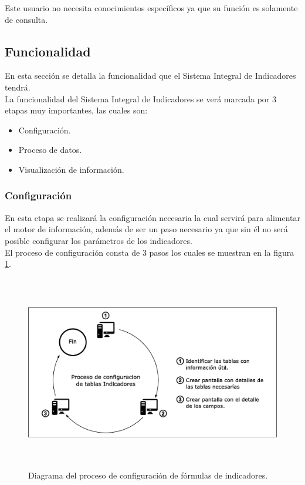				Este usuario no necesita conocimientos espec\'ificos ya que su funci\'on es solamente de consulta.

		\subsection{Funcionalidad}

			En esta secci\'on se detalla la funcionalidad que el Sistema Integral de Indicadores tendr\'a.\\

			La funcionalidad del Sistema Integral de Indicadores se ver\'a marcada por 3 etapas muy importantes, las cuales son:
			\begin{itemize}
				\item Configuraci\'on.
				\item Proceso de datos.
				\item Visualizaci\'on de informaci\'on.
			\end{itemize}

			\subsubsection{Configuraci\'on}

				En esta etapa se realizar\'a la configuraci\'on necesaria la cual servir\'a para alimentar el motor de informaci\'on, adem\'as de ser un paso necesario ya que sin \'el no ser\'a posible configurar los par\'ametros de los indicadores.\\

				El proceso de configuraci\'on consta de 3 pasos los cuales se muestran en la figura \ref{fig_ConfiguracionIndicadores}.\\

				\begin{figure}[H]
			        \centering
			        \includegraphics[width=16cm, height=8.5cm]{figuras/ConfiguracionIndicadores}
			        \caption{Diagrama del proceso de configuraci\'on de f\'ormulas de indicadores.}
			        \label{fig_ConfiguracionIndicadores}
			    \end{figure}

